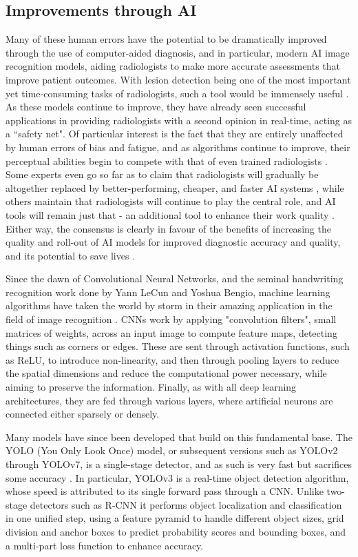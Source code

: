 \subsection{Improvements through AI}
Many of these human errors have the potential to be dramatically improved through the use of computer-aided diagnosis, and in particular, modern AI image recognition models, aiding radiologists to make more accurate assessments that improve patient outcomes. With lesion detection being one of the most important yet time-consuming tasks of radiologists, such a tool would be immensely useful \cite{deep_learning_survey}. As these models continue to improve, they have already seen successful applications in providing radiologists with a second opinion in real-time, acting as a ``safety net". Of particular interest is the fact that they are entirely unaffected by human errors of bias and fatigue, and as algorithms continue to improve, their perceptual abilities begin to compete with that of even trained radiologists \cite{workload}. Some experts even go so far as to claim that radiologists will gradually be altogether replaced by better-performing, cheaper, and faster AI systems \cite{ai_foe}, while others maintain that radiologists will continue to play the central role, and AI tools will remain just that - an additional tool to enhance their work quality \cite{doctors_ftw}. Either way, the consensus is clearly in favour of the benefits of increasing the quality and roll-out of AI models for improved diagnostic accuracy and quality, and its potential to save lives \cite{consensus}\cite{ai_adoption}. 

Since the dawn of Convolutional Neural Networks, and the seminal handwriting recognition work done by Yann LeCun and Yoshua Bengio, machine learning algorithms have taken the world by storm in their amazing application in the field of image recognition \cite{cnn_lecun_bengio}. CNNs work by applying "convolution filters", small matrices of weights, across an input image to compute feature maps, detecting things such as corners or edges. These are sent through activation functions, such as ReLU, to introduce non-linearity, and then through pooling layers to reduce the spatial dimensions and reduce the computational power necessary, while aiming to preserve the information. Finally, as with all deep learning architectures, they are fed through various layers, where artificial neurons are connected either sparsely or densely. 

Many models have since been developed that build on this fundamental base. The YOLO (You Only Look Once) model, or subsequent versions such as YOLOv2 through YOLOv7, is a single-stage detector, and as such is very fast but sacrifices some accuracy \cite{yolo}. In particular, YOLOv3 is a real-time object detection algorithm, whose speed is attributed to its single forward pass through a CNN. Unlike two-stage detectors such as R-CNN it performs object localization and classification in one unified step, using a feature pyramid to handle different object sizes, grid division and anchor boxes to predict probability scores and bounding boxes, and a multi-part loss function to enhance accuracy.


